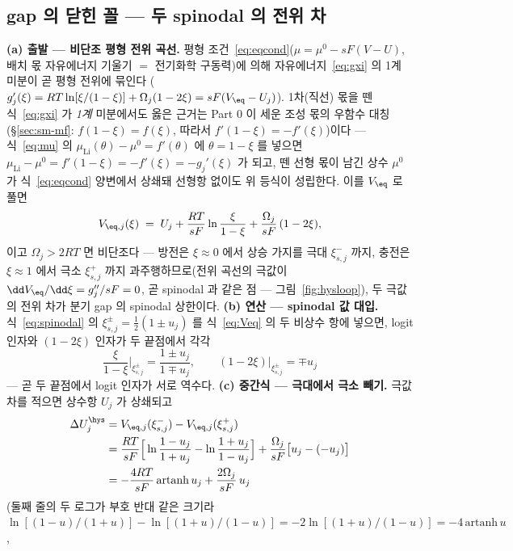 \subsection{gap 의 닫힌 꼴 --- 두 spinodal 의 전위 차}\label{sec:hys-gap}
\textbf{(a) 출발 --- 비단조 평형 전위 곡선.} 평형 조건~\eqref{eq:eqcond}($\mu=\mu^0-sF(V-U)$, 배치 몫 자유에너지 기울기 $=$ 전기화학 구동력)에 의해 자유에너지~\eqref{eq:gxi} 의 1계 미분이 곧 평형 전위에 묶인다
($g_j'(\xi)=RT\ln[\xi/(1-\xi)]+\Omega_j(1-2\xi)=sF(V_\eq-U_j)$). 1차(직선) 몫을 뗀 식~\eqref{eq:gxi} 가 \emph{1계} 미분에서도
옳은 근거는 Part 0 이 세운 조성 몫의 우함수 대칭(\S\ref{sec:sm-mf}: $f(1-\xi)=f(\xi)$, 따라서 $f'(1-\xi)=-f'(\xi)$)이다
--- 식~\eqref{eq:mu} 의 $\mu_\mathrm{Li}(\theta)-\mu^0=f'(\theta)$
에 $\theta=1-\xi$ 를 넣으면 $\mu_\mathrm{Li}-\mu^0=f'(1-\xi)=-f'(\xi)=-g_j'(\xi)$ 가 되고, 뗀 선형 몫이 남긴 상수 $\mu^0$ 가
식~\eqref{eq:eqcond} 양변에서 상쇄돼 선형항 없이도 위 등식이 성립한다. 이를 $V_\eq$ 로 풀면
\begin{equation}
V_{\eq,j}(\xi)\;=\;U_j+\frac{RT}{sF}\ln\frac{\xi}{1-\xi}+\frac{\Omega_j}{sF}\,(1-2\xi),
\label{eq:Veq}
\end{equation}
이고 $\Omega_j>2RT$ 면 비단조다 --- 방전은 $\xi\!\approx\!0$ 에서 상승 가지를 극대 $\xi_{s,j}^-$ 까지, 충전은 $\xi\!\approx\!1$
에서 극소 $\xi_{s,j}^+$ 까지 과주행하므로(전위 곡선의 극값이 $\dd V_\eq/\dd\xi=g_j''/sF=0$, 곧 spinodal 과 같은 점 ---
그림~\ref{fig:hysloop}), 두 극값의 전위 차가 분기 gap 의 spinodal 상한이다. \textbf{(b) 연산 --- spinodal 값 대입.}
식~\eqref{eq:spinodal} 의 $\xi_{s,j}^\pm=\tfrac12(1\pm u_j)$ 를 식~\eqref{eq:Veq} 의 두 비상수 항에 넣으면, logit 인자와
$(1-2\xi)$ 인자가 두 끝점에서 각각
\begin{equation}
\frac{\xi}{1-\xi}\bigg|_{\xi_{s,j}^\pm}=\frac{1\pm u_j}{1\mp u_j},
\qquad
(1-2\xi)\big|_{\xi_{s,j}^\pm}=\mp u_j
\label{eq:hyssub}
\end{equation}
--- 곧 두 끝점에서 logit 인자가 서로 역수다. \textbf{(c) 중간식 --- 극대에서 극소 빼기.} 극값 차를 적으면 상수항 $U_j$ 가
상쇄되고
\begin{align}
\Delta U_j^\hys
&=V_{\eq,j}(\xi_{s,j}^-)-V_{\eq,j}(\xi_{s,j}^+)\notag\\
&=\frac{RT}{sF}\Big[\ln\frac{1-u_j}{1+u_j}-\ln\frac{1+u_j}{1-u_j}\Big]
+\frac{\Omega_j}{sF}\big[u_j-(-u_j)\big]\notag\\
&=-\frac{4RT}{sF}\,\mathrm{artanh}\,u_j+\frac{2\Omega_j}{sF}\,u_j
\label{eq:hysdiff}
\end{align}
(둘째 줄의 두 로그가 부호 반대 같은 크기라 $\ln[(1-u)/(1+u)]-\ln[(1+u)/(1-u)]=-2\ln[(1+u)/(1-u)]=-4\,\mathrm{artanh}\,u$,
